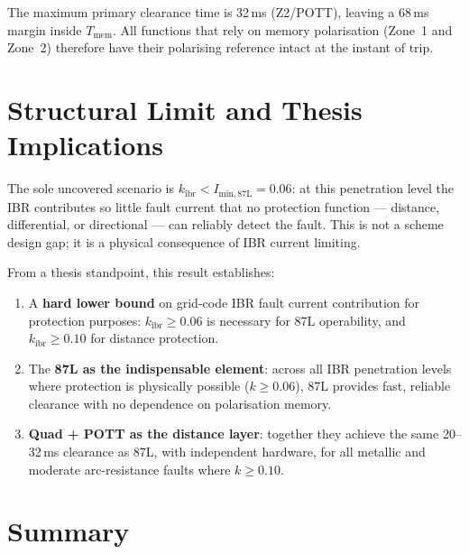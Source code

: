 \documentclass[11pt,a4paper]{article}
\begin{document}
\noindent
The maximum primary clearance time is 32\,ms (Z2/POTT), leaving a 68\,ms
margin inside $T_\mathrm{mem}$.  All functions that rely on memory
polarisation (Zone~1 and Zone~2) therefore have their polarising reference
intact at the instant of trip.

\section{Structural Limit and Thesis Implications}
\label{sec:limit}

The sole uncovered scenario is $k_\mathrm{ibr}<I_\mathrm{min,87L}=0.06$: at
this penetration level the IBR contributes so little fault current that no
protection function --- distance, differential, or directional --- can reliably
detect the fault.  This is not a scheme design gap; it is a physical consequence
of IBR current limiting.

From a thesis standpoint, this result establishes:
\begin{enumerate}
  \item A \textbf{hard lower bound} on grid-code IBR fault current contribution
    for protection purposes: $k_\mathrm{ibr}\geq0.06$ is necessary for 87L
    operability, and $k_\mathrm{ibr}\geq0.10$ for distance protection.

  \item The \textbf{87L as the indispensable element}: across all IBR penetration
    levels where protection is physically possible ($k\geq0.06$), 87L provides
    fast, reliable clearance with no dependence on polarisation memory.

  \item \textbf{Quad + POTT as the distance layer}: together they achieve the
    same 20--32\,ms clearance as 87L, with independent hardware, for all
    metallic and moderate arc-resistance faults where $k\geq0.10$.
\end{enumerate}

\section{Summary}
\label{sec:summary}
\end{document}
